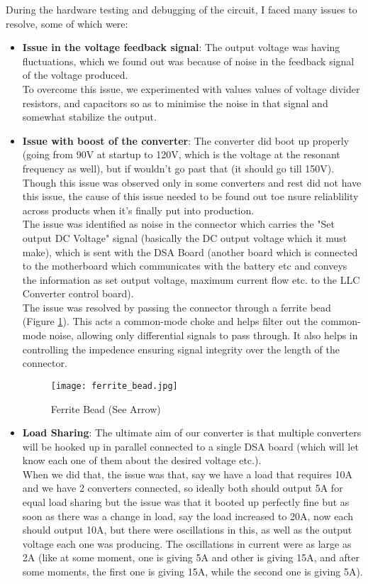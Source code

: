 During the hardware testing and debugging of the circuit, I faced many issues to resolve, some of which were:
\begin{itemize}
    \item \textbf{Issue in the voltage feedback signal}: The output voltage was having fluctuations, which we found out was because of noise in the feedback signal of the voltage produced.\\
    To overcome this issue, we experimented with values values of voltage divider resistors, and capacitors so as to minimise the noise in that signal and somewhat stabilize the output.
    \item \textbf{Issue with boost of the converter}: The converter did boot up properly (going from 90V at startup to 120V, which is the voltage at the resonant frequency as well), but if wouldn't go past that (it should go till 150V). Though this issue was observed only in some converters and rest did not have this issue, the cause of this issue needed to be found out toe nsure reliablility across products when it's finally put into production.\\
    The issue was identified as noise in the connector which carries the "Set output DC Voltage" signal (basically the DC output voltage which it must make), which is sent with the DSA Board (another board which is connected to the motherboard which communicates with the battery etc and conveys the information as set output voltage, maximum current flow etc. to the LLC Converter control board).\\
    The issue was resolved by passing the connector through a ferrite bead (Figure \ref*{fig:ferrite-bead}). This acts a common-mode choke and helps filter out the common-mode noise, allowing only differential signals to pass through. It also helps in controlling the impedence ensuring signal integrity over the length of the connector.
    \begin{figure}[H]
        \centering
        \texttt{[image: ferrite\_bead.jpg]}
        \caption{Ferrite Bead (See Arrow)}
        \label{fig:ferrite-bead}
    \end{figure}
    \item \textbf{Load Sharing}: The ultimate aim of our converter is that multiple converters will be hooked up in parallel connected to a single DSA board (which will let know each one of them about the desired voltage etc.).\\
    When we did that, the issue was that, say we have a load that requires 10A and we have 2 converters connected, so ideally both should output 5A for equal load sharing but the issue was that it booted up perfectly fine but as soon as there was a change in load, say the load increased to 20A, now each should output 10A, but there were oscillations in this, as well as the output voltage each one was producing. The oscillations in current were as large as 2A (like at some moment, one is giving 5A and other is giving 15A, and after some moments, the first one is giving 15A, while the second one is giving 5A).\\

\end{itemize}

